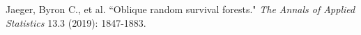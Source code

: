 \documentclass[final]{beamer}\usepackage[]{graphicx}\usepackage[]{xcolor}
\begin{document}
\begin{frame}[t]
\begin{multicols}{3}
\begin{thebibliography}{99}

 Jaeger, Byron C., et al. ``Oblique random survival forests." \emph{The Annals of Applied Statistics} 13.3 (2019): 1847-1883.



\end{thebibliography}

\end{multicols}

\end{frame}
\end{document}
